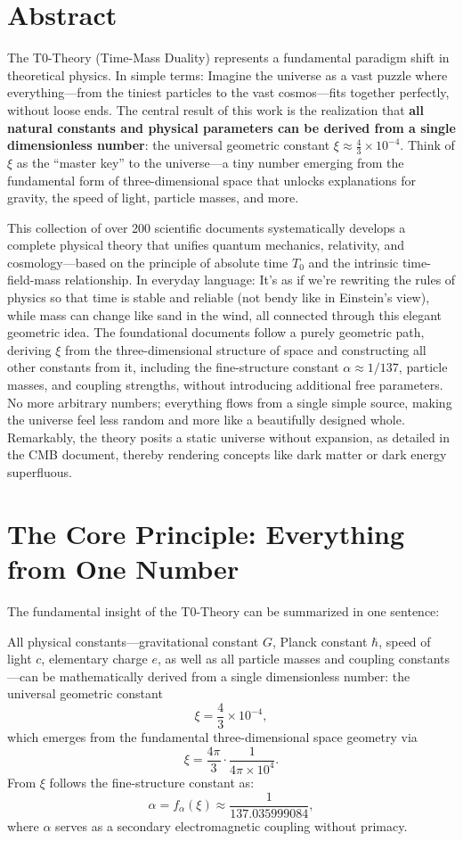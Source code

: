 \section*{Abstract}
		The T0-Theory (Time-Mass Duality) represents a fundamental paradigm shift in theoretical physics. In simple terms: Imagine the universe as a vast puzzle where everything—from the tiniest particles to the vast cosmos—fits together perfectly, without loose ends. The central result of this work is the realization that \textbf{all natural constants and physical parameters can be derived from a single dimensionless number}: the universal geometric constant $\xi \approx \frac{4}{3} \times 10^{-4}$. Think of $\xi$ as the ``master key'' to the universe—a tiny number emerging from the fundamental form of three-dimensional space that unlocks explanations for gravity, the speed of light, particle masses, and more.
		
		This collection of over 200 scientific documents systematically develops a complete physical theory that unifies quantum mechanics, relativity, and cosmology—based on the principle of absolute time $T_0$ and the intrinsic time-field-mass relationship. In everyday language: It's as if we're rewriting the rules of physics so that time is stable and reliable (not bendy like in Einstein's view), while mass can change like sand in the wind, all connected through this elegant geometric idea. The foundational documents follow a purely geometric path, deriving $\xi$ from the three-dimensional structure of space and constructing all other constants from it, including the fine-structure constant $\alpha \approx 1/137$, particle masses, and coupling strengths, without introducing additional free parameters. No more arbitrary numbers; everything flows from a single simple source, making the universe feel less random and more like a beautifully designed whole. Remarkably, the theory posits a static universe without expansion, as detailed in the CMB document, thereby rendering concepts like dark matter or dark energy superfluous.

	
	\section{The Core Principle: Everything from One Number}
	
	The fundamental insight of the T0-Theory can be summarized in one sentence:
	
	\begin{keyresult}
		All physical constants—gravitational constant $G$, Planck constant $\hbar$, speed of light $c$, elementary charge $e$, as well as all particle masses and coupling constants—can be mathematically derived from a single dimensionless number: the universal geometric constant
		\[
		\xi = \frac{4}{3} \times 10^{-4},
		\]
		which emerges from the fundamental three-dimensional space geometry via
		\[
		\xi = \frac{4\pi}{3} \cdot \frac{1}{4\pi \times 10^4}.
		\]
		From $\xi$ follows the fine-structure constant as:
		\[
		\alpha = f_\alpha(\xi) \approx \frac{1}{137.035999084},
		\]
		where $\alpha$ serves as a secondary electromagnetic coupling without primacy.
	\end{keyresult}
	
